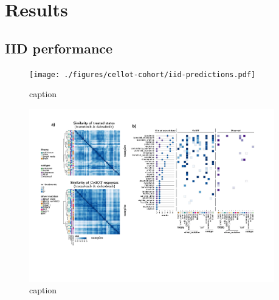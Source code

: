 \section{Results}

\subsection{IID performance}
\begin{figure}[htb]
  \begin{center}
    \texttt{[image: ./figures/cellot-cohort/iid-predictions.pdf]}
  \end{center}
  \caption{caption}
  \label{iid-prediction}
\end{figure}

\begin{figure}
  \begin{center}
    \includegraphics[width=0.95\textwidth]{figures/cellot-cohort/iid-associations.pdf}
  \end{center}
  \caption{caption}
  \label{fig:iid-associations}
\end{figure}

